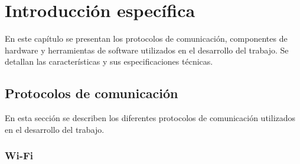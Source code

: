 \chapter{Introducción específica}

En este capítulo se presentan los protocolos de comunicación, componentes de
hardware y herramientas de software utilizados en el desarrollo del trabajo. Se
detallan las características y sus especificaciones técnicas.


\section{Protocolos de comunicación}

En esta sección se describen los diferentes protocolos de comunicación
utilizados en el desarrollo del trabajo. %


\subsection{Wi-Fi}

